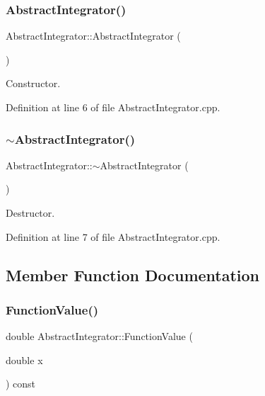 \subsubsection{\texorpdfstring{Abstract\+Integrator()}{AbstractIntegrator()}}
{\footnotesize\ttfamily Abstract\+Integrator\+::\+Abstract\+Integrator (\begin{DoxyParamCaption}{ }\end{DoxyParamCaption})}



Constructor. 



Definition at line 6 of file Abstract\+Integrator.\+cpp.

\mbox{\label{class_abstract_integrator_addc528450d3f1d6e5d2cbd81e7d545e0}} 
\subsubsection{\texorpdfstring{$\sim$\+Abstract\+Integrator()}{~AbstractIntegrator()}}
{\footnotesize\ttfamily Abstract\+Integrator\+::$\sim$\+Abstract\+Integrator (\begin{DoxyParamCaption}{ }\end{DoxyParamCaption})\hspace{0.3cm}{\ttfamily [virtual]}}



Destructor. 



Definition at line 7 of file Abstract\+Integrator.\+cpp.



\subsection{Member Function Documentation}
\mbox{\label{class_abstract_integrator_a6262731b81f3ad7e984ba354b4601356}} 
\subsubsection{\texorpdfstring{Function\+Value()}{FunctionValue()}}
{\footnotesize\ttfamily double Abstract\+Integrator\+::\+Function\+Value (\begin{DoxyParamCaption}\item[{double}]{x }\end{DoxyParamCaption}) const}



